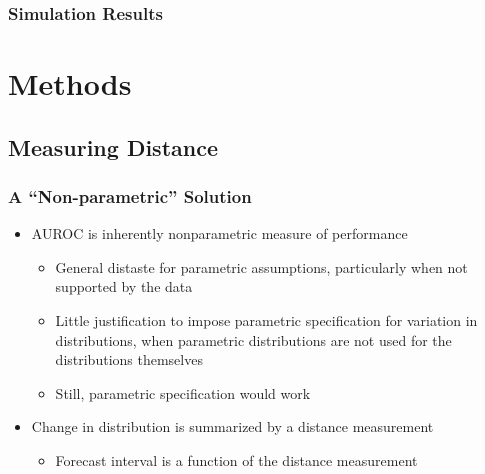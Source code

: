 \documentclass{beamer}
\begin{document}

\begin{frame}
\frametitle{Simulation Results}




\end{frame}




\section{Methods}
\subsection{Measuring Distance}



\begin{frame}
\frametitle{A ``Non-parametric'' Solution}


\begin{itemize}
    \item AUROC is inherently nonparametric measure of performance
    \begin{itemize}
        \item General distaste for parametric assumptions, particularly when not supported by the data
        \item Little justification to impose parametric specification for variation in distributions, when parametric distributions are not used for the distributions themselves
        \item Still, parametric specification would work
    \end{itemize}
    \item Change in distribution is summarized by a distance measurement
    \begin{itemize}
        \item Forecast interval is a function of the distance measurement
    \end{itemize}
\end{itemize}

\end{frame}
\end{document}
